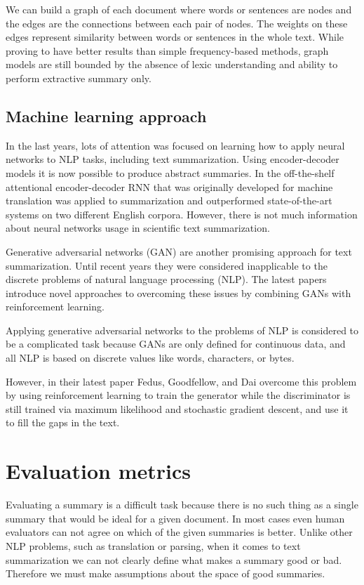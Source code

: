 \documentclass[sigplan]{acmart}
\begin{document}
We can build a graph of each document where words or sentences are nodes and the edges are the connections between each pair of nodes. The weights on these edges represent similarity between words or sentences in the whole text. While proving to have better results than simple frequency-based methods, graph models are still bounded by the absence of lexic understanding and ability to perform extractive summary only.

\subsection{Machine learning approach}

In the last years, lots of attention was focused on learning how to apply neural networks to NLP tasks, including text summarization. Using encoder-decoder models it is now possible to produce abstract summaries. In \cite{nallapati-16} the off-the-shelf attentional encoder-decoder RNN that was originally developed for machine translation was applied to summarization and outperformed state-of-the-art systems on two different English corpora. However, there is not much information about neural networks usage in scientific text summarization.

Generative adversarial networks (GAN) are another promising approach for text summarization. Until recent years they were considered inapplicable to the discrete problems of natural language processing (NLP). The latest papers introduce novel approaches to overcoming these issues by combining GANs with reinforcement learning.

Applying generative adversarial networks to the problems of NLP is considered to be a complicated task because GANs are only defined for continuous data, and all NLP is based on discrete values like words, characters, or bytes.

However, in their latest paper Fedus, Goodfellow, and Dai\cite{fedus-18} overcome this problem by using reinforcement learning to train the generator while the discriminator is still trained via maximum likelihood and stochastic gradient descent, and use it to fill the gaps in the text.


\section{Evaluation metrics}
\label{sec:evaluation}

Evaluating a summary is a difficult task because there is no such thing as a single summary that would be ideal for a given document. In most cases even human evaluators can not agree on which of the given summaries is better\cite{das-7}. Unlike other NLP problems, such as translation or parsing, when it comes to text summarization we can not clearly define what makes a summary good or bad. Therefore we must make assumptions about the space of good summaries. 
\end{document}

